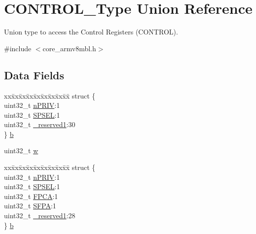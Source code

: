 \hypertarget{union_c_o_n_t_r_o_l___type}{}\section{C\+O\+N\+T\+R\+O\+L\+\_\+\+Type Union Reference}
\label{union_c_o_n_t_r_o_l___type}


Union type to access the Control Registers (C\+O\+N\+T\+R\+OL).  




{\ttfamily \#include $<$core\+\_\+armv8mbl.\+h$>$}

\subsection*{Data Fields}
\begin{DoxyCompactItemize}
\item 
\begin{tabbing}
xx\=xx\=xx\=xx\=xx\=xx\=xx\=xx\=xx\=\kill
struct \{\\
\>uint32\_t \mbox{\hyperlink{union_c_o_n_t_r_o_l___type_a2a6e513e8a6bf4e58db169e312172332}{nPRIV}}:1\\
\>uint32\_t \mbox{\hyperlink{union_c_o_n_t_r_o_l___type_ae185aac93686ffc78e998a9daf41415b}{SPSEL}}:1\\
\>uint32\_t \mbox{\hyperlink{union_c_o_n_t_r_o_l___type_a959a73d8faee56599b7e792a7c5a2d16}{\_reserved1}}:30\\
\} \mbox{\hyperlink{union_c_o_n_t_r_o_l___type_a9b2a02dbdbcfc9e50af1e1f8fc3b36a9}{b}}\\

\end{tabbing}\item 
uint32\+\_\+t \mbox{\hyperlink{union_c_o_n_t_r_o_l___type_ad0fb62e7a08e70fc5e0a76b67809f84b}{w}}
\item 
\begin{tabbing}
xx\=xx\=xx\=xx\=xx\=xx\=xx\=xx\=xx\=\kill
struct \{\\
\>uint32\_t \mbox{\hyperlink{union_c_o_n_t_r_o_l___type_a2a6e513e8a6bf4e58db169e312172332}{nPRIV}}:1\\
\>uint32\_t \mbox{\hyperlink{union_c_o_n_t_r_o_l___type_ae185aac93686ffc78e998a9daf41415b}{SPSEL}}:1\\
\>uint32\_t \mbox{\hyperlink{union_c_o_n_t_r_o_l___type_a2518558c090f60161ba4e718a54ee468}{FPCA}}:1\\
\>uint32\_t \mbox{\hyperlink{union_c_o_n_t_r_o_l___type_a40e45b21a6a619be3b6d5ce9c5bc5ffb}{SFPA}}:1\\
\>uint32\_t \mbox{\hyperlink{union_c_o_n_t_r_o_l___type_a959a73d8faee56599b7e792a7c5a2d16}{\_reserved1}}:28\\
\} \mbox{\hyperlink{union_c_o_n_t_r_o_l___type_a348a017940fd600d7ff461a8c06098dd}{b}}\\


\end{tabbing}
\end{DoxyCompactItemize}
